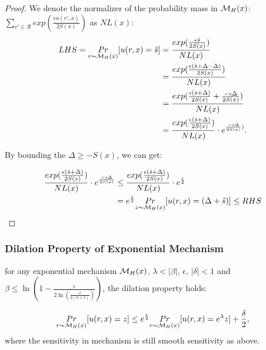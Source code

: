 \begin{proof}

We denote the normalizer of the probability mass in $\mathcal{M}_H(x)$: $\sum_{r' \in \mathcal{R}}exp(\frac{\epsilon u(r',x)}{2 S(x)})$ as $NL(x)$:
\begin{equation*}
\begin{split}
LHS 
  = \underset{r \thicksim \mathcal{M}_H(x)}{Pr}[u(r,x) = \hat{s}]
& = \frac{exp(\frac{\epsilon \hat{s}}{2 S(x)})}{NL(x)}\\
& = \frac{exp(\frac{\epsilon (\hat{s} + \Delta - \Delta)}{2 S(x)})}{NL(x)}\\
& = \frac{exp(\frac{\epsilon (\hat{s} + \Delta)}{2 S(x)} + \frac{- \epsilon \Delta}{2 S(x)})}{NL(x)}\\
& = \frac{exp(\frac{\epsilon (\hat{s} + \Delta)}{2 S(x)})}{NL(x)} \cdot e^{\frac{- \epsilon \Delta}{2 S(x)})}.\\
\end{split}
\end{equation*}

By bounding the $\Delta \geq -S(x)$, we can get:

\begin{equation*}
\begin{split}
\frac{exp(\frac{\epsilon (\hat{s} + \Delta)}{2 S(x)})}{NL(x)} \cdot e^{\frac{- \epsilon \Delta}{2 S(x)}}
& \leq \frac{exp(\frac{\epsilon (\hat{s} + \Delta)}{2 S(x)})}{NL(x)} \cdot e^{\frac{\epsilon}{2}}\\
&  =  e^{\frac{\epsilon}{2}} \underset{z \thicksim \mathcal{M}_H(x)}{Pr}[u(r,x) = (\Delta + \hat{s})] \leq RHS\\
\end{split}
\end{equation*}

\end{proof}

\subsubsection{Dilation Property of Exponential Mechanism}
\begin{lem}
for any exponential mechanism $\mathcal{M}_H(x)$, $\lambda < |\beta|$, $\epsilon$, $|\delta| < 1$ and $\beta \leq \ln(1 - \frac{\epsilon}{2 \ln (\frac{\delta}{2 (n + 1)})})$, the dilation property holds:

\begin{equation*}
\underset{r \thicksim \mathcal{M}_H(x)}{Pr}[u(r,x) = z]
\leq
e^{\frac{\epsilon}{2}} \underset{r \thicksim \mathcal{M}_H(x)}{Pr}[u(r,x) = e^{\lambda} z] + \frac{\delta}{2},
\end{equation*}
where the sensitivity in mechanism is still smooth sensitivity as above.
\end{lem}


